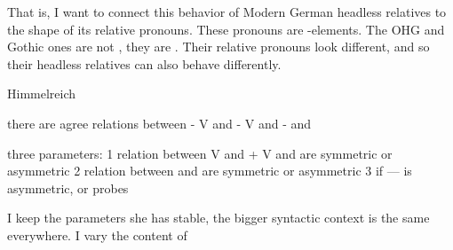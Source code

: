That is, I want to connect this behavior of Modern German headless relatives to the shape of its relative pronouns. These pronouns are -elements. The OHG and Gothic ones are not , they are . Their relative pronouns look different, and so their headless relatives can also behave differently.




Himmelreich

there are agree relations between
- V and 
- V and 
-  and 

three parameters:
1 relation between V and  + V and  are symmetric or asymmetric
2 relation between  and  are symmetric or asymmetric
3 if  ---  is asymmetric,  or  probes

I keep the parameters she has stable, the bigger syntactic context is the same everywhere. I vary the content of 
